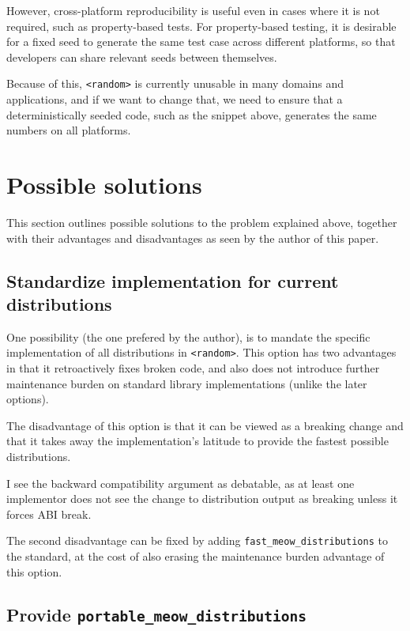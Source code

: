 \documentclass{wg21}
\begin{document}
However, cross-platform reproducibility is useful even in cases
where it is not required, such as property-based tests. For property-based
testing, it is desirable for a fixed seed to generate the same
test case across different platforms, so that developers can share
relevant seeds between themselves.

Because of this, \texttt{<random>} is currently unusable in many
domains and applications, and if we want to change that, we need
to ensure that a deterministically seeded code, such as the snippet
above, generates the same numbers on all platforms.


\hypertarget{possible-solutions}{%
    \section{Possible solutions}\label{possible-solutions}}

This section outlines possible solutions to the problem explained above,
together with their advantages and disadvantages as seen by the author of
this paper.

\hypertarget{standardize-implementation}{%
    \subsection{Standardize implementation for current distributions}\label{possible-solutions}}

One possibility (the one prefered by the author), is to mandate the specific
implementation of all distributions in \texttt{<random>}. This option
has two advantages in that it retroactively fixes broken code, and
also does not introduce further maintenance burden on standard library
implementations (unlike the later options).

The disadvantage of this option is that it can be viewed as a breaking
change and that it takes away the implementation's latitude to provide
the fastest possible distributions.

I see the backward compatibility argument as debatable, as at least one
implementor does not see the change to distribution output as breaking
unless it forces ABI break\cite{msvc-github}.

The second disadvantage can be fixed by adding \texttt{fast_meow_distributions}
to the standard, at the cost of also erasing the maintenance burden advantage
of this option.


\hypertarget{portable-overloads}{%
    \subsection{Provide \texttt{portable_meow_distributions}}\label{portable-overloads}}
\end{document}
